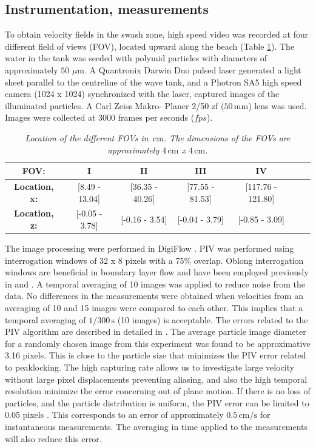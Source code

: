 \documentclass[review, authoryear]{elsarticle}
\newcommand{\s}{\,\mbox{s}}
\newcommand{\cm}{\,\mbox{cm}}
\newcommand{\mm}{\,\mbox{mm}}
\newcommand{\cmps}{\,\mbox{cm/s}}
\begin{document}
\subsection{Instrumentation, measurements}
\label{ins_measure}
To obtain velocity fields in the swash zone, high speed video was recorded at four different field of views (FOV), located upward along the beach (Table \ref{tab:loc}).  The water in the tank was seeded with polymid particles with diameters of approximately $50$ $\mu$m. A Quantronix Darwin Duo pulsed laser generated a light sheet parallel to the centreline of the wave tank, and a Photron SA5 high speed camera (1024 x 1024) synchronized with the laser, captured images of the illuminated particles. A Carl Zeiss Makro- Planer 2/50 zf ($50\mm$) lens was used. Images were collected at 3000 frames per seconds ($fps$).
 \begin{table}[]
 \centering
\caption{\textit{Location of the different FOVs  in $\cm$. The dimensions of the FOVs are approximately $4\cm$ x $4\cm$.}}
\begin{tabular}{|c|c|c|c|c|c|c|}
\hline
\textbf{FOV:}      & I                   & II                 & III     & IV \\ \hline
\textbf{Location, x:}& {[}8.49 - 13.04{]} & {[}36.35 - 40.26{]} & {[}77.55 - 81.53{]} & {[}117.76 - 121.80{]} 
 \\ \hline
\textbf{Location, z:}&  {[}-0.05 - 3.78{]} & {[}-0.16 - 3.54{]} & {[}-0.04 - 3.79{]} & {[}-0.85 - 3.09{]} 
\\ \hline
\end{tabular}
\label{tab:loc}
\end{table}
The image processing were performed in DigiFlow \citep{digiflow}. PIV was performed using interrogation windows of 32 x 8 pixels with a 75\% overlap. Oblong interrogation windows are beneficial in boundary layer flow and have been employed previously in \cite{liu2007boundary} and \cite{pedersen2013runup}. A temporal averaging of 10 images was applied to reduce noise from the data. No differences in the measurements were obtained when velocities from an averaging of 10 and 15 images were compared to each other. This implies that a temporal averaging of $1/300 \s$ (10 images) is acceptable. The errors related to the PIV algorithm are described in detailed in \cite{raffel2013particle}. The average particle image diameter for a randomly chosen image from this experiment was found to be approximative 3.16 pixels. This is close to the particle size that minimizes the PIV error related to peaklocking. The high capturing rate allows us to investigate large velocity without large pixel displacements preventing aliasing, and also the high temporal resolution minimize the error concerning out of plane motion. If there is no loss of particles, and the particle distribution is uniform, the PIV error can be limited to 0.05 pixels \citep{kahler2016main}. This corresponds to an error of approximately $0.5\cmps$ for instantaneous measurements. The averaging in time applied to the measurements will also reduce this error.
\end{document}
